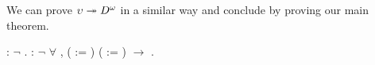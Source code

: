 We can prove $\upsilon \twoheadrightarrow D^\omega$ in a similar way and
conclude by proving our main theorem.
\begin{singlespace}
\begin{coqdoccode}
\coqdocnoindent
{}
: \ensuremath{\lnot}
.\coqdoceol
\coqdocemptyline
\coqdocnoindent
{} 
: \ensuremath{\lnot} \ensuremath{\forall}  
,\coqdoceol
\coqdocindent{1.00em}
( := ) ( :=
) 
\ensuremath{\rightarrow}
.\coqdoceol
\end{coqdoccode}
\end{singlespace}
